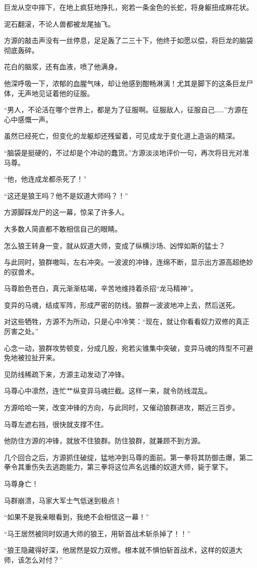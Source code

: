 \begin{this_body}
巨龙从空中摔下，在地上疯狂地挣扎，宛若一条金色的长蛇，将身躯扭成麻花状。

泥石翻滚，不论人兽都被龙尾抽飞。

方源的敲击声没有一丝停息，足足轰了二三十下，他终于如愿以偿，将巨龙的脑袋彻底轰碎。

花白的脑浆，还有血液，喷了他满身。

他深呼吸一下，浓郁的血腥气味，却让他感到酣畅淋漓！尤其是脚下的这条巨龙尸体，无声地见证着他的征服。

“男人，不论活在哪个世界上，都是为了征服啊。征服敌人，征服自己……”方源在心中感慨一声。

虽然已经死亡，但变化的龙躯却还残留着，可见成龙于变化道上造诣的精深。

“脑袋是挺硬的，不过却是个冲动的蠢货。”方源淡淡地评价一句，再次将目光对准马尊。

“他，他连成龙都杀死了！”

“这还是狼王吗？他不是奴道大师吗？！”

方源脚踩龙尸的这一幕，惊呆了许多人。

大多数人简直都不敢相信自己的眼睛。

怎么狼王转身一变，就从奴道大师，变成了纵横沙场、凶悍如斯的猛士？

与此同时，狼群嗷叫，左右冲突。一波波的冲锋，连绵不断，显示出方源高超绝妙的驭兽术。

马尊脸色苍白，真元渐渐枯竭，辛苦地维持着杀招“龙马精神”。

变异的马魂，结成军阵，形成严密的防线。狼群一波波地冲上去，然后送死。

对这些牺牲，方源不为所动，只是心中冷笑：“现在，就让你看看奴力双修的真正厉害之处。”

心念一动，狼群攻势顿变，分成几股，宛若尖锥集中突破，变异马魂的阵型不可避免地被拉扯开来。

见防线稀疏下来，方源主动发动了冲锋。

马尊心中凛然，连忙艹纵变异马魂拦截。这样一来，就令防线混乱。

方源哈哈一笑，改变冲锋的方向，与此同时，又催动狼群进攻，期近三百步。

马尊左遮右挡，很快就支撑不住。

他防住方源的冲锋，就放不住狼群。防住狼群，就兼顾不到方源。

几个回合之后，方源抓住破绽，猛地冲到马尊的面前。第一拳将其防御击爆，第二拳令其重伤失去逃跑能力，第三拳将这位声名远播的奴道大师，毙于掌下。

马尊身亡！

马群崩溃，马家大军士气低迷到极点！

“如果不是我亲眼看到，我绝不会相信这一幕！”

“马王居然被同时奴道大师的狼王，用斩首战术斩杀掉了！！”

“狼王隐藏得好深，他居然是奴力双修。根本就不惧怕斩首战术，这样的奴道大师，该怎么对付？”

\end{this_body}

